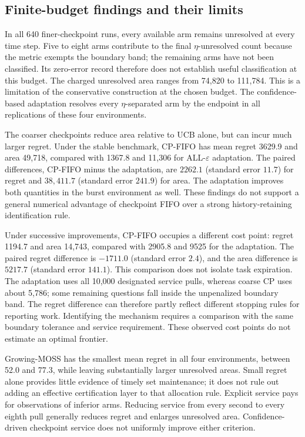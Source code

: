 \subsection{Finite-budget findings and their limits}

In all 640 finer-checkpoint runs, every available arm remains unresolved
at every time step. Five to eight arms contribute to the final
$\eta$-unresolved count because the metric exempts the boundary band;
the remaining arms have not been classified. Its zero-error record
therefore does not establish useful classification at this budget.
The charged unresolved area ranges from 74,820 to 111,784. This is a
limitation of the conservative construction at the chosen budget.
The confidence-based adaptation resolves every $\eta$-separated arm by
the endpoint in all replications of these four environments.

The coarser checkpoints reduce area relative to UCB alone, but can incur
much larger regret. Under the stable benchmark, CP-FIFO has mean regret
3629.9 and area 49,718, compared with 1367.8 and 11,306 for
ALL-$\varepsilon$ adaptation. The paired differences, CP-FIFO minus the
adaptation, are $2262.1$ (standard error $11.7$) for regret and
$38{,}411.7$ (standard error $241.9$) for area. The adaptation improves
both quantities in the burst environment as well. These findings do not
support a general numerical advantage of checkpoint FIFO over a strong
history-retaining identification rule.

Under successive improvements, CP-FIFO occupies a different cost point:
regret 1194.7 and area 14,743, compared with 2905.8 and 9525 for the
adaptation. The paired regret difference is $-1711.0$ (standard error
$2.4$), and the area difference is $5217.7$ (standard error $141.1$).
This comparison does not isolate task expiration. The adaptation uses
all 10,000 designated service pulls, whereas coarse CP uses about 5,786;
some remaining questions fall inside the unpenalized boundary band.
The regret difference can therefore partly reflect different stopping
rules for reporting work. Identifying the mechanism requires a comparison
with the same boundary tolerance and service requirement. These observed
cost points do not estimate an optimal frontier.

Growing-MOSS has the smallest mean regret in all four environments,
between 52.0 and 77.3, while leaving substantially larger unresolved
areas. Small regret alone provides little evidence of timely set
maintenance; it does not rule out adding an effective certification
layer to that allocation rule. Explicit service pays for observations of
inferior arms. Reducing service from every second to every eighth pull
generally reduces regret and enlarges unresolved area. Confidence-driven
checkpoint service does not uniformly improve either criterion.

